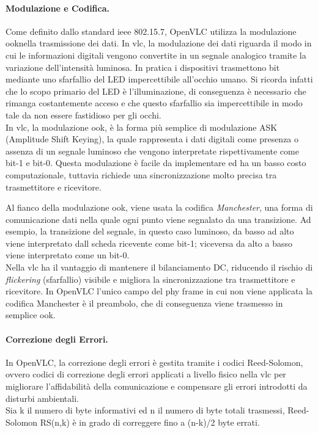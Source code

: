 \paragraph{Modulazione e Codifica.}
\noindent Come definito dallo standard \gls{ieee} 802.15.7, OpenVLC utilizza la modulazione \gls{ook}\glsfirstoccur nella trasmissione dei dati. In \gls{vlc}, la modulazione dei dati riguarda il modo in cui le informazioni digitali vengono convertite in un segnale analogico tramite la variazione dell'intensità luminosa. In pratica i dispositivi trasmettono bit mediante uno sfarfallio del LED impercettibile all'occhio umano. Si ricorda infatti che lo scopo primario del LED è l'illuminazione, di conseguenza è necessario che rimanga costantemente acceso e che questo sfarfallio sia impercettibile in modo tale da non essere fastidioso per gli occhi.\\
In \gls{vlc}, la modulazione \gls{ook}, è la forma più semplice di modulazione ASK (Amplitude Shift Keying), la quale rappresenta i dati digitali come presenza o assenza di un segnale luminoso che vengono interpretate rispettivamente come bit-1 e bit-0. Questa modulazione è facile da implementare ed ha un basso costo computazionale, tuttavia richiede una sincronizzazione molto precisa tra trasmettitore e ricevitore.

Al fianco della modulazione \gls{ook}, viene usata la codifica \textit{Manchester}, una forma di comunicazione dati nella quale ogni punto viene segnalato da una transizione. Ad esempio, la transizione del segnale, in questo caso luminoso, da basso ad alto viene interpretato dall scheda ricevente come bit-1; viceversa da alto a basso viene interpretato come un bit-0.\\
Nella \gls{vlc} ha il vantaggio di mantenere il bilanciamento DC, riducendo il rischio di \textit{flickering} (sfarfallio) visibile e migliora la sincronizzazione tra trasmettitore e ricevitore.
In OpenVLC l'unico campo del \gls{phy} frame in cui non viene applicata la codifica Manchester è il preambolo, che di conseguenza viene trasmesso in semplice \gls{ook}.

\paragraph{Correzione degli Errori.}
In OpenVLC, la correzione degli errori è gestita tramite i codici Reed-Solomon, ovvero codici di correzione degli errori applicati a livello fisico nella \gls{vlc} per migliorare l'affidabilità della comunicazione e compensare gli errori introdotti da disturbi ambientali.\\
Sia k il numero di byte informativi ed n il numero di byte totali trasmessi, Reed-Solomon RS(n,k) è in grado di correggere fino a (n-k)/2 byte errati.

